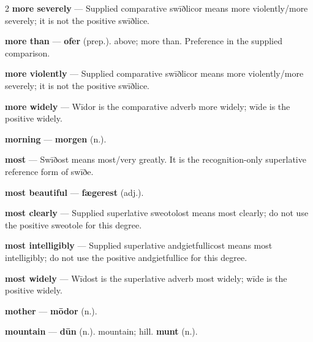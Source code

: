 \begin{multicols}{2}
\textbf{more severely} — Supplied comparative swīðlicor means more violently/more severely; it is not the positive swīðlice.\par
\textbf{more than} — \textbf{ofer} (prep.). above; more than. Preference in the supplied comparison.\par
\textbf{more violently} — Supplied comparative swīðlicor means more violently/more severely; it is not the positive swīðlice.\par
\textbf{more widely} — Wīdor is the comparative adverb more widely; wīde is the positive widely.\par
\textbf{morning} — \textbf{morgen} (n.).\par
\textbf{most} — Swīðost means most/very greatly. It is the recognition-only superlative reference form of swīðe.\par
\textbf{most beautiful} — \textbf{fægerest} (adj.).\par
\textbf{most clearly} — Supplied superlative sweotolost means most clearly; do not use the positive sweotole for this degree.\par
\textbf{most intelligibly} — Supplied superlative andgietfullicost means most intelligibly; do not use the positive andgietfullice for this degree.\par
\textbf{most widely} — Wīdost is the superlative adverb most widely; wīde is the positive widely.\par
\textbf{mother} — \textbf{mōdor} (n.).\par
\textbf{mountain} — \textbf{dūn} (n.). mountain; hill. \textbf{munt} (n.).\par

\end{multicols}
